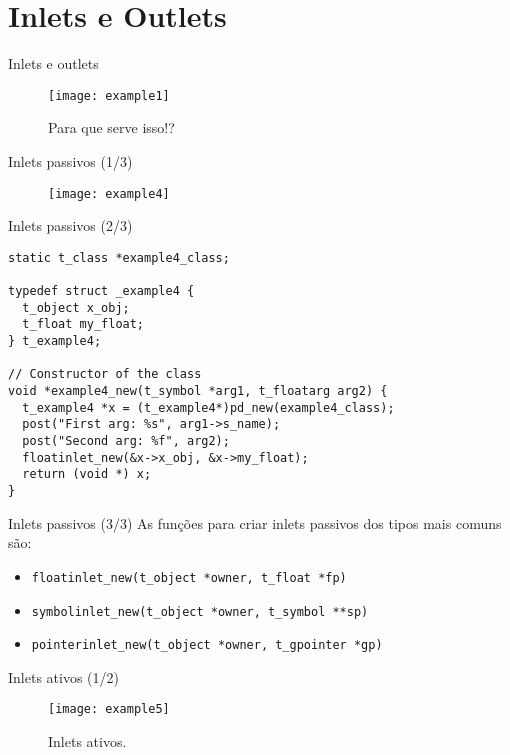 \section{Inlets e Outlets}


\begin{frame}{Inlets e outlets}
\begin{figure}[ht!]
\centering
\texttt{[image: example1]}
\caption{Para que serve isso!?}
\end{figure}
\end{frame}


\begin{frame}{Inlets passivos (1/3)}
\begin{figure}[h!]
\centering
\texttt{[image: example4]}
\label{fig:inlet-passivo}
\end{figure}
\end{frame}


\begin{frame}[fragile]{Inlets passivos (2/3)}
\begin{lstlisting}
static t_class *example4_class;

typedef struct _example4 {
  t_object x_obj;
  t_float my_float;
} t_example4;

// Constructor of the class
void *example4_new(t_symbol *arg1, t_floatarg arg2) {
  t_example4 *x = (t_example4*)pd_new(example4_class);
  post("First arg: %s", arg1->s_name);
  post("Second arg: %f", arg2);
  floatinlet_new(&x->x_obj, &x->my_float);
  return (void *) x;
}
\end{lstlisting}
\end{frame}


\begin{frame}{Inlets passivos (3/3)}
As funções para criar inlets passivos dos tipos mais comuns são:
\begin{itemize}
\item \texttt{floatinlet\_new(t\_object *owner, t\_float *fp)}
\item \texttt{symbolinlet\_new(t\_object *owner, t\_symbol **sp)}
\item \texttt{pointerinlet\_new(t\_object *owner, t\_gpointer *gp)}
\end{itemize}
\end{frame}


\begin{frame}{Inlets ativos (1/2)}
\begin{figure}[h!]
\centering
\texttt{[image: example5]}
\caption{Inlets ativos.}
\label{fig:inlet-ativo}
\end{figure}
\end{frame}


